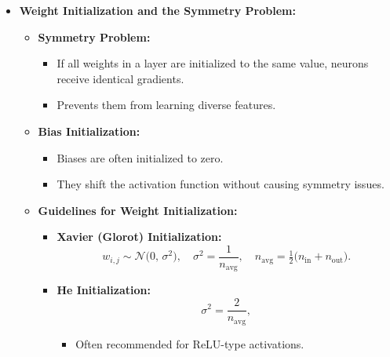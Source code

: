 \documentclass{article}
\begin{document}
\begin{itemize}
    \item \textbf{Weight Initialization and the Symmetry Problem:}
    \begin{itemize}
        \item \textbf{Symmetry Problem:}
        \begin{itemize}
            \item If all weights in a layer are initialized to the same value, neurons receive identical gradients.
            \item Prevents them from learning diverse features.
        \end{itemize}
        \item \textbf{Bias Initialization:}
        \begin{itemize}
            \item Biases are often initialized to zero.
            \item They shift the activation function without causing symmetry issues.
        \end{itemize}
        \item \textbf{Guidelines for Weight Initialization:}
        \begin{itemize}
            \item \textbf{Xavier (Glorot) Initialization:}
            \[
            w_{i,j} \sim \mathcal{N}\!\bigl(0,\,\sigma^2\bigr), \quad \sigma^2 = \frac{1}{n_{\text{avg}}}, \quad n_{\text{avg}} = \tfrac{1}{2}\bigl(n_{\text{in}} + n_{\text{out}}\bigr).
            \]
            \item \textbf{He Initialization:}
            \[
            \sigma^2 = \frac{2}{n_{\text{avg}}},
            \]
            \begin{itemize}
                \item Often recommended for ReLU-type activations.
            \end{itemize}
        \end{itemize}
    \end{itemize}
    

\end{itemize}
\end{document}
